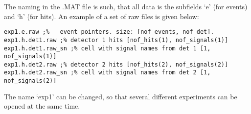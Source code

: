 The naming in the .MAT file is such, that all data is the subfields `e' (for events) and `h' (for hits). An example of a set of raw files is given below:

\lstset{language=MATLAB}
\begin{lstlisting}
exp1.e.raw ;% 	event pointers. size: [nof_events, nof_det]. 
exp1.h.det1.raw ;% detector 1 hits [nof_hits(1), nof_signals(1)]
exp1.h.det1.raw_sn ;% cell with signal names from det 1 [1, nof_signals(1)]
exp1.h.det2.raw ;% detector 2 hits [nof_hits(2), nof_signals(2)]
exp1.h.det2.raw_sn ;% cell with signal names from det 2 [1, nof_signals(2)]
\end{lstlisting}

The name `exp1' can be changed, so that several different experiments can be opened at the same time.


